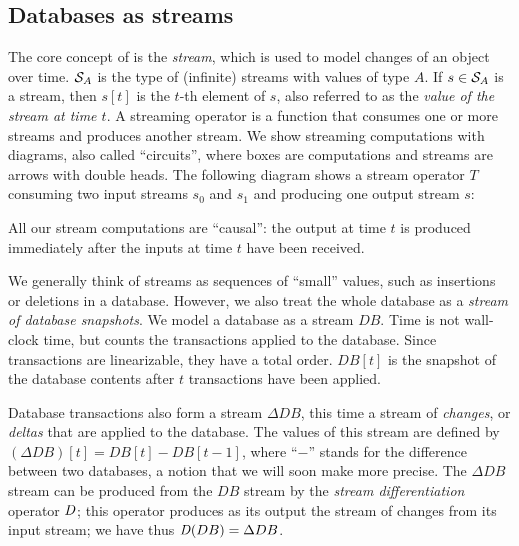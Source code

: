 \subsection{Databases as streams}

The core concept of \dbsp is the \emph{stream}, which is used to model
changes of an object over time.  $\mathcal{S}_{A}$ is the type of
(infinite) streams with values of type $A$. If $s \in \mathcal{S}_{A}$ is a
stream, then $s[t]$ is the $t$-th element of $s$, also referred to as
the \emph{value of the stream at time $t$}.  A streaming operator is a
function that consumes one or more streams and produces another
stream.  We show streaming computations with diagrams, also called
``circuits'', where boxes are computations and streams are arrows with
double heads.  The following diagram shows a stream operator $T$
consuming two input streams $s_0$ and $s_1$ and producing one output
stream $s$:

\begin{center}
\end{center}

All our stream computations are ``causal'': the output at time $t$ is
produced immediately after the inputs at time $t$ have been received.

We generally think of streams as sequences of ``small'' values, such
as insertions or deletions in a database.  However, we also treat the
whole database as a \emph{stream of database snapshots}.  We model a
database as a stream $DB$.  Time is not wall-clock time, but counts
the transactions applied to the database.  Since transactions are
linearizable, they have a total order.  $DB[t]$ is the snapshot of the
database contents after $t$ transactions have been applied.

Database transactions also form a stream $\Delta DB$, this time a
stream of \emph{changes}, or \emph{deltas} that are applied to the
database.  The values of this stream are defined by $(\Delta DB)[t] =
DB[t] - DB[t-1]$, where ``$-$'' stands for the difference between two
databases, a notion that we will soon make more precise.  The $\Delta
DB$ stream can be produced from the $DB$ stream by the \emph{stream
differentiation} operator $\mathit{D}$; this operator produces as its output
the stream of changes from its input stream; we have thus $\mathit{D}(DB) =
\Delta DB$.


